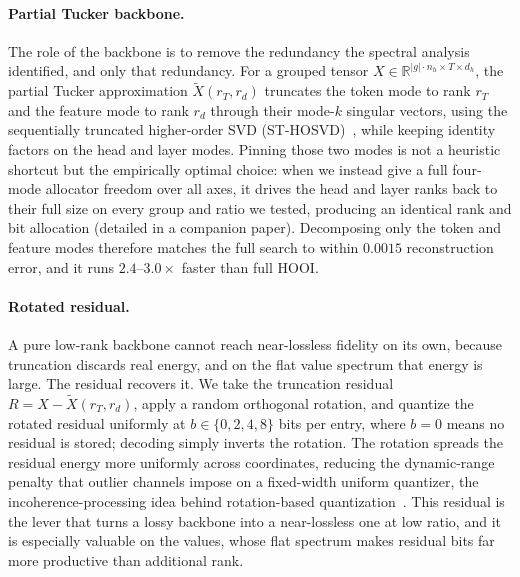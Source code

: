 \documentclass{article}
\begin{document}
\paragraph{Partial Tucker backbone.} The role of the backbone is to remove the redundancy the spectral analysis identified, and only that redundancy. For a grouped tensor $X \in \mathbb{R}^{|g| \cdot n_h \times T \times d_h}$, the partial Tucker approximation $\tilde X(r_T, r_d)$ truncates the token mode to rank $r_T$ and the feature mode to rank $r_d$ through their mode-$k$ singular vectors, using the sequentially truncated higher-order SVD (ST-HOSVD)~\citep{vannieuwenhoven2012sthosvd}, while keeping identity factors on the head and layer modes. Pinning those two modes is not a heuristic shortcut but the empirically optimal choice: when we instead give a full four-mode allocator freedom over all axes, it drives the head and layer ranks back to their full size on every group and ratio we tested, producing an identical rank and bit allocation (detailed in a companion paper). Decomposing only the token and feature modes therefore matches the full search to within $0.0015$ reconstruction error, and it runs $2.4$--$3.0\times$ faster than full HOOI.

\paragraph{Rotated residual.} A pure low-rank backbone cannot reach near-lossless fidelity on its own, because truncation discards real energy, and on the flat value spectrum that energy is large. The residual recovers it. We take the truncation residual $R = X - \tilde X(r_T, r_d)$, apply a random orthogonal rotation, and quantize the rotated residual uniformly at $b \in \{0, 2, 4, 8\}$ bits per entry, where $b{=}0$ means no residual is stored; decoding simply inverts the rotation. The rotation spreads the residual energy more uniformly across coordinates, reducing the dynamic-range penalty that outlier channels impose on a fixed-width uniform quantizer, the incoherence-processing idea behind rotation-based quantization~\citep{ashkboos2024quarot,liu2025spinquant}. This residual is the lever that turns a lossy backbone into a near-lossless one at low ratio, and it is especially valuable on the values, whose flat spectrum makes residual bits far more productive than additional rank.
\end{document}
